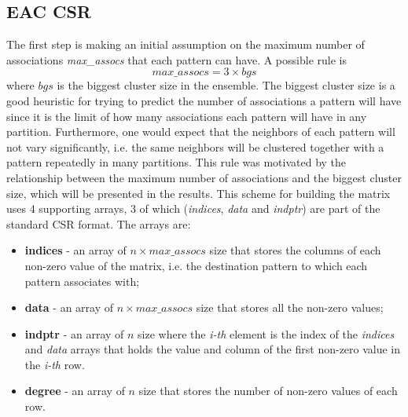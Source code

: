 \subsection{EAC CSR}

The first step is making an initial assumption on the maximum number of associations \emph{max\_assocs} that each pattern can have.
A possible rule is $$max\_assocs = 3 \times bgs$$ where $bgs$ is the biggest cluster size in the ensemble.
The biggest cluster size is a good heuristic for trying to predict the number of associations a pattern will have since it is the limit of how many associations each pattern will have in any partition.
Furthermore, one would expect that the neighbors of each pattern will not vary significantly, i.e. the same neighbors will be clustered together with a pattern repeatedly in many partitions.
This rule was motivated by the relationship between the maximum number of associations and the biggest cluster size, which will be presented in the results.
This scheme for building the matrix uses 4 supporting arrays, 3 of which (\emph{indices}, \emph{data} and \emph{indptr}) are part of the standard CSR format. The arrays are:

\begin{itemize}
	\item \textbf{indices} - an array of $n \times max\_assocs$ size that stores the columns of each non-zero value of the matrix, i.e. the destination pattern to which each pattern associates with;
	\item \textbf{data} - an array of $n \times max\_assocs$ size that stores all the non-zero values;
	\item \textbf{indptr} - an array of $n$ size where the \emph{i-th} element is the index of the \emph{indices} and \emph{data} arrays that holds the value and column of the first non-zero value in the \emph{i-th} row.
	\item \textbf{degree} - an array of $n$ size that stores the number of non-zero values of each row.
\end{itemize}


